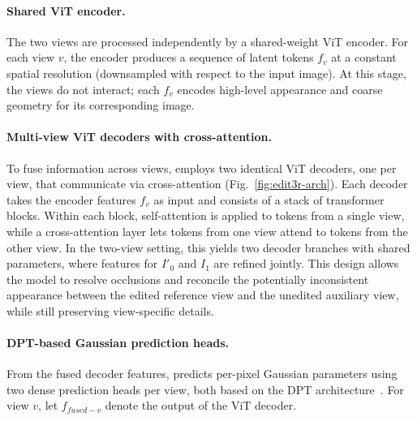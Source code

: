 \paragraph{Shared ViT encoder.}
The two views are processed independently by a shared-weight ViT encoder.
For each view \(v\), the encoder produces a sequence of latent tokens
\(f_v\) at a constant spatial resolution (downsampled with respect to the input image).
At this stage, the views do not interact; each \(f_v\) encodes high-level appearance and coarse geometry for its corresponding image.

\paragraph{Multi-view ViT decoders with cross-attention.}
To fuse information across views, {\ourmethod} employs two identical ViT decoders, one per view, that communicate via cross-attention (Fig.~\ref{fig:edit3r-arch}).
Each decoder takes the encoder features \(f_v\) as input and consists of a stack of transformer blocks.
Within each block, self-attention is applied to tokens from a single view, while a cross-attention layer lets tokens from one view attend to tokens from the other view.
In the two-view setting, this yields two decoder branches with shared parameters, where features for \(I'_0\) and \(I_1\) are refined jointly.
This design allows the model to resolve occlusions and reconcile the potentially inconsistent appearance between the edited reference view and the unedited auxiliary view, while still preserving view-specific details.

\paragraph{DPT-based Gaussian prediction heads.}
From the fused decoder features, {\ourmethod} predicts per-pixel Gaussian parameters using two dense prediction heads per view, both based on the DPT architecture~\cite{dust3r}. For view \(v\), let \(f_{fused-v}\) denote the output of the ViT decoder.

